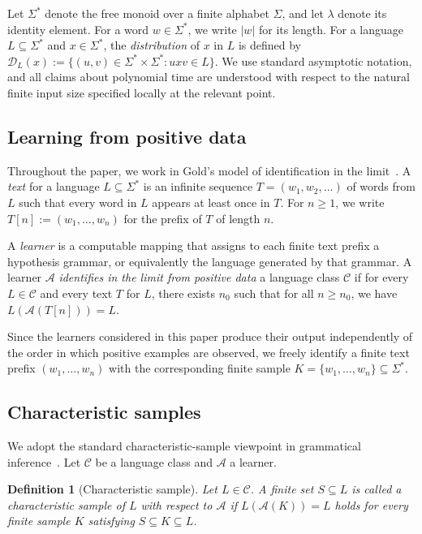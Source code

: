 \documentclass[11pt,a4paper]{article}
\newtheorem{definition}[theorem]{Definition}
\newcommand{\D}{\mathcal{D}}
\begin{document}
Let $\Sigma^*$ denote the free monoid over a finite alphabet $\Sigma$,
and let $\lambda$ denote its identity element. For a word
$w\in\Sigma^*$, we write $|w|$ for its length. For a language
$L\subseteq\Sigma^*$ and $x\in\Sigma^*$, the \emph{distribution} of $x$
in $L$ is defined by
$\D_L(x):=\{(u,v)\in\Sigma^*\times\Sigma^*:uxv\in L\}$.
We use standard asymptotic notation, and all claims about polynomial
time are understood with respect to the natural finite input size
specified locally at the relevant point.

\subsection{Learning from positive data}

Throughout the paper, we work in Gold's model of identification in the
limit~\cite{gold1967}. A \emph{text} for a language $L\subseteq\Sigma^*$
is an infinite sequence $T=(w_1,w_2,\dots)$ of words from $L$ such that
every word in $L$ appears at least once in $T$. For $n\ge 1$, we write
$T[n]:=(w_1,\dots,w_n)$ for the prefix of $T$ of length $n$.

A \emph{learner} is a computable mapping that assigns to each finite
text prefix a hypothesis grammar, or equivalently the language generated
by that grammar. A learner $\mathcal A$ \emph{identifies in the limit
from positive data} a language class $\mathcal C$ if for every
$L\in\mathcal C$ and every text $T$ for $L$, there exists $n_0$ such
that for all $n\ge n_0$, we have $L(\mathcal A(T[n]))=L$.

Since the learners considered in this paper produce their output
independently of the order in which positive examples are observed, we
freely identify a finite text prefix $(w_1,\dots,w_n)$ with the
corresponding finite sample $K=\{w_1,\dots,w_n\}\subseteq\Sigma^*$.

\subsection{Characteristic samples}

We adopt the standard characteristic-sample viewpoint in grammatical
inference~\cite{higuera1997,higuera2010}. Let $\mathcal C$ be a language
class and $\mathcal A$ a learner.

\begin{definition}[Characteristic sample]
Let $L\in\mathcal C$. A finite set $S\subseteq L$ is called a
\emph{characteristic sample} of $L$ with respect to $\mathcal A$ if
$L(\mathcal A(K))=L$ holds for every finite sample $K$ satisfying
$S\subseteq K\subseteq L$.
\end{definition}
\end{document}
